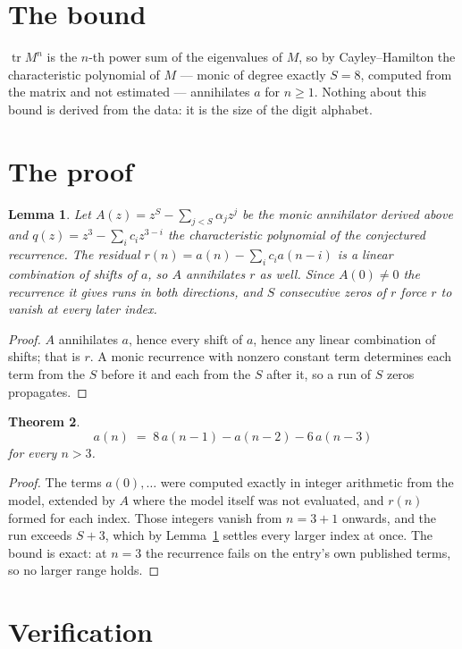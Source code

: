 \documentclass[11pt,a4paper]{article}
\theoremstyle{plain}
\newtheorem{theorem}{Theorem}
\newtheorem{lemma}[theorem]{Lemma}
\theoremstyle{definition}
\begin{document}
\section{The bound}

$\operatorname{tr}M^{n}$ is the $n$-th power sum of the eigenvalues of $M$, so by
Cayley--Hamilton the characteristic polynomial of $M$ --- monic of degree exactly $S=8$,
computed from the matrix and not estimated --- annihilates $a$ for $n\ge1$. Nothing about this
bound is derived from the data: it is the size of the digit alphabet.

\section{The proof}

\begin{lemma}\label{lem:crit}
Let $A(z)=z^S-\sum_{j<S}\alpha_jz^{j}$ be the monic annihilator derived above and
$q(z)=z^{3}-\sum_ic_iz^{3-i}$ the characteristic polynomial of the conjectured
recurrence. The residual $r(n)=a(n)-\sum_ic_ia(n-i)$ is a linear combination of shifts of $a$,
so $A$ annihilates $r$ as well. Since $A(0)\ne0$ the recurrence it gives runs in both
directions, and $S$ consecutive zeros of $r$ force $r$ to vanish at every later index.
\end{lemma}

\begin{proof}
$A$ annihilates $a$, hence every shift of $a$, hence any linear combination of shifts; that is
$r$. A monic recurrence with nonzero constant term determines each term from the $S$ before it
and each from the $S$ after it, so a run of $S$ zeros propagates.
\end{proof}

\begin{theorem}
\[
a(n)\;=\;8\,a(n-1) - a(n-2) - 6\,a(n-3)
\]
for every $n>3$.
\end{theorem}

\begin{proof}
The terms $a(0),\dots$ were computed exactly in integer arithmetic from the model, extended by
$A$ where the model itself was not evaluated, and $r(n)$ formed for each index. Those integers
vanish from $n=3+1$ onwards, and the run exceeds $S+3$, which by
Lemma~\ref{lem:crit} settles every larger index at once. The bound is exact: at $n=3$ the recurrence fails on the entry's own published terms, so no larger range holds.
\end{proof}

\section{Verification}
\end{document}
